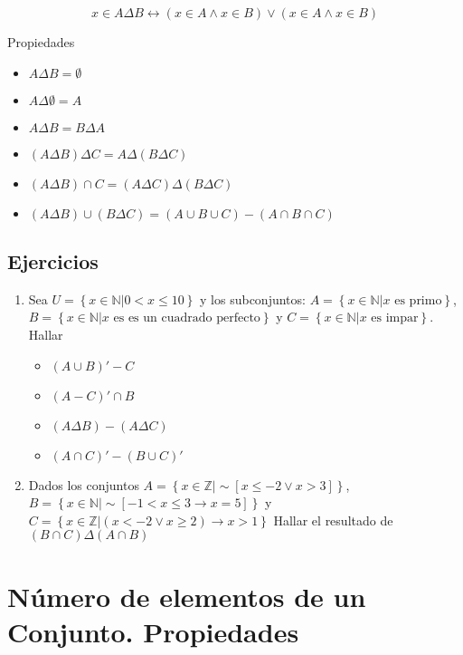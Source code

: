 \documentclass[
  16pt,
]{krantz}
\providecommand{\tightlist}{%
  \setlength{\itemsep}{0pt}\setlength{\parskip}{0pt}}
\theoremstyle{definition}
\theoremstyle{definition}
\theoremstyle{definition}
\theoremstyle{definition}
\theoremstyle{remark}
\begin{document}
\[
x\in A\Delta B\leftrightarrow (x\in A\wedge x\in B)\vee (x\in A\wedge x\in B)
\]

Propiedades

\begin{itemize}
\tightlist
\item
  \(A\Delta B=\emptyset\)
\item
  \(A\Delta \emptyset=A\)
\item
  \(A\Delta B=B\Delta A\)
\item
  \((A\Delta B)\Delta C=A\Delta(B\Delta C)\)
\item
  \((A\Delta B)\cap C=(A\Delta C)\Delta(B\Delta C)\)
\item
  \((A\Delta B)\cup(B\Delta C)=(A\cup B\cup C)-(A\cap B\cap C)\)
\end{itemize}

\hypertarget{ejercicios}{%
\subsection{Ejercicios}\label{ejercicios}}

\begin{enumerate}
\def\labelenumi{\arabic{enumi}.}
\item
  Sea \(U=\left\{x\in\mathbb{N}|0<x\leq 10\right\}\) y los subconjuntos: \(A=\left\{x\in\mathbb{N}|\text{$x$ es primo}\right\}\), \(B=\left\{x\in\mathbb{N}|\text{$x$ es es un cuadrado perfecto}\right\}\) y \(C=\left\{x\in\mathbb{N}|\text{$x$ es impar}\right\}\). Hallar

  \begin{itemize}
  \tightlist
  \item
    \((A\cup B)'-C\)
  \item
    \((A-C)'\cap B\)
  \item
    \((A\Delta B)-(A\Delta C)\)
  \item
    \((A\cap C)'-(B\cup C)'\)
  \end{itemize}
\item
  Dados los conjuntos \(A=\left\{x\in\mathbb{Z}|\sim[x\leq -2\vee x>3]\right\}\), \(B=\left\{x\in\mathbb{N}|\sim[-1<x\leq 3\rightarrow x=5]\right\}\) y \(C=\left\{x\in\mathbb{Z}|(x< -2\vee x\geq 2)\rightarrow x>1\right\}\) Hallar el resultado de \((B\cap C)\Delta(A\cap B)\)
\end{enumerate}

\hypertarget{nuxfamero-de-elementos-de-un-conjunto.-propiedades}{%
\section{Número de elementos de un Conjunto. Propiedades}\label{nuxfamero-de-elementos-de-un-conjunto.-propiedades}}
\end{document}
